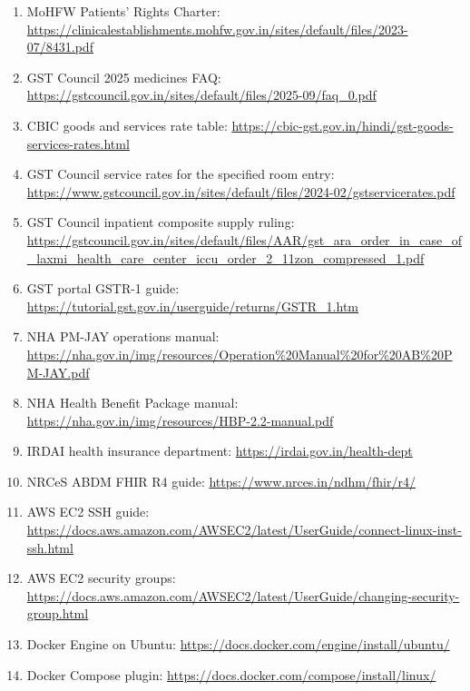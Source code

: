 \documentclass[11pt,a4paper]{article}
\begin{document}
\begin{enumerate}
\item MoHFW Patients' Rights Charter: \url{https://clinicalestablishments.mohfw.gov.in/sites/default/files/2023-07/8431.pdf}
\item GST Council 2025 medicines FAQ: \url{https://gstcouncil.gov.in/sites/default/files/2025-09/faq_0.pdf}
\item CBIC goods and services rate table: \url{https://cbic-gst.gov.in/hindi/gst-goods-services-rates.html}
\item GST Council service rates for the specified room entry: \url{https://www.gstcouncil.gov.in/sites/default/files/2024-02/gstservicerates.pdf}
\item GST Council inpatient composite supply ruling: \url{https://gstcouncil.gov.in/sites/default/files/AAR/gst_ara_order_in_case_of_laxmi_health_care_center_iccu_order_2_11zon_compressed_1.pdf}
\item GST portal GSTR-1 guide: \url{https://tutorial.gst.gov.in/userguide/returns/GSTR_1.htm}
\item NHA PM-JAY operations manual: \url{https://nha.gov.in/img/resources/Operation%20Manual%20for%20AB%20PM-JAY.pdf}
\item NHA Health Benefit Package manual: \url{https://nha.gov.in/img/resources/HBP-2.2-manual.pdf}
\item IRDAI health insurance department: \url{https://irdai.gov.in/health-dept}
\item NRCeS ABDM FHIR R4 guide: \url{https://www.nrces.in/ndhm/fhir/r4/}
\item AWS EC2 SSH guide: \url{https://docs.aws.amazon.com/AWSEC2/latest/UserGuide/connect-linux-inst-ssh.html}
\item AWS EC2 security groups: \url{https://docs.aws.amazon.com/AWSEC2/latest/UserGuide/changing-security-group.html}
\item Docker Engine on Ubuntu: \url{https://docs.docker.com/engine/install/ubuntu/}
\item Docker Compose plugin: \url{https://docs.docker.com/compose/install/linux/}
\end{enumerate}
\end{document}
